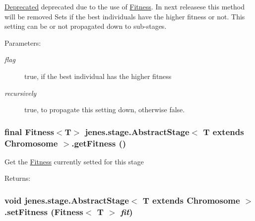 \begin{Desc}
\item[\hyperlink{deprecated__deprecated000003}{Deprecated}]deprecated due to the use of \hyperlink{}{Fitness}. In next releasese this method will be removed Sets if the best individuals have the higher fitness or not. This setting can be or not propagated down to sub-stages.\end{Desc}
\begin{Desc}
\item[Parameters:]
\begin{description}
\item[{\em flag}]true, if the best individual has the higher fitness \item[{\em recursively}]true, to propagate this setting down, otherwise false. \end{description}
\end{Desc}
\hypertarget{classjenes_1_1stage_1_1_abstract_stage_3_01_t_01extends_01_chromosome_01_4_9de5f0a09b7791fe1e93123ada1c434a}{
\subsubsection[getFitness]{\setlength{\rightskip}{0pt plus 5cm}final Fitness$<$T$>$ jenes.stage.AbstractStage$<$ T extends Chromosome $>$.getFitness ()}}
\label{classjenes_1_1stage_1_1_abstract_stage_3_01_t_01extends_01_chromosome_01_4_9de5f0a09b7791fe1e93123ada1c434a}


Get the \hyperlink{}{Fitness} currently setted for this stage \begin{Desc}
\item[Returns:]\end{Desc}
\hypertarget{classjenes_1_1stage_1_1_abstract_stage_3_01_t_01extends_01_chromosome_01_4_d60267d0a803c2991ac3ef02ababef2b}{
\subsubsection[setFitness]{\setlength{\rightskip}{0pt plus 5cm}void jenes.stage.AbstractStage$<$ T extends Chromosome $>$.setFitness (Fitness$<$ T $>$ {\em fit})}}
\label{classjenes_1_1stage_1_1_abstract_stage_3_01_t_01extends_01_chromosome_01_4_d60267d0a803c2991ac3ef02ababef2b}


